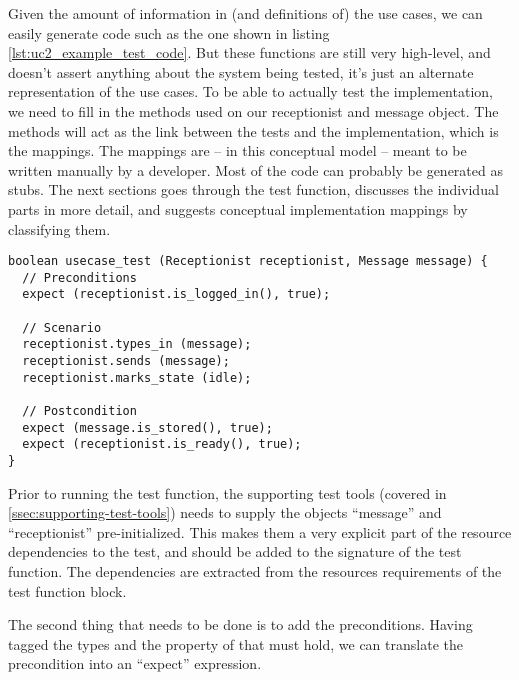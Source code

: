 \noindent Given the amount of information in (and definitions of) the use cases, we can easily generate code such as the one shown in listing \ref{lst:uc2_example_test_code}. But these functions are still very high-level, and doesn't assert anything about the system being tested, it's just an alternate representation of the use cases. To be able to actually test the implementation, we need to fill in the methods used on our receptionist and message object. The methods will act as the link between the tests and the implementation, which is the mappings. The mappings are -- in this conceptual model -- meant to be written manually by a developer. Most of the code can probably be generated as stubs. The next sections goes through the test function, discusses the individual parts in more detail, and suggests conceptual implementation mappings by classifying them.
\begin{lstlisting}[style=Dart, caption=Suggested structure of generated test case,label={lst:uc2_example_test_code}]
boolean usecase_test (Receptionist receptionist, Message message) {
  // Preconditions
  expect (receptionist.is_logged_in(), true);

  // Scenario
  receptionist.types_in (message);
  receptionist.sends (message);
  receptionist.marks_state (idle);
  
  // Postcondition
  expect (message.is_stored(), true);
  expect (receptionist.is_ready(), true);
}
\end{lstlisting}
Prior to running the test function, the supporting test tools (covered in \ref{ssec:supporting-test-tools}) needs to supply the objects ``message'' and ``receptionist'' pre-initialized. This makes them a very explicit part of the resource dependencies to the test, and should be added to the signature of the test function. The dependencies are extracted from the resources requirements of the test function block.\medskip

\noindent The second thing that needs to be done is to add the preconditions. Having tagged the types and the property of that must hold, we can translate the precondition into an ``expect'' expression.\medskip

